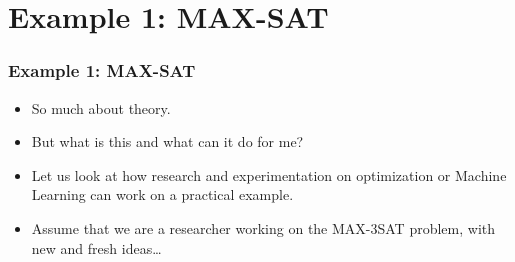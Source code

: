 %
\edef\maxSat{MAX-SAT}%
\edef\maxTSat{MAX-3SAT}%
\def\oFlip{\ensuremath{1}-flip}%
\def\tFlip{\ensuremath{2}-flip}%
\def\mFlip{\ensuremath{m}-flip}%
%
\section{Example 1: \maxSat}%
%
\xdef\maxSatExamplePath{../../examples/maxSat}%
%
%
\begin{frame}%
\frametitle{Example 1: \maxSat}%
\begin{itemize}%
\item So much about theory.%
\item<2-> But what is this \inQuotes{\optimizationBenchmarking} and what can it do for me?%
\item<3-> Let us look at how research and experimentation on optimization or Machine Learning can work on a practical example.\bigskip%
\item<4-> Assume that we are a researcher working on the {\maxTSat} problem, with new and fresh ideas\dots%
\end{itemize}%
\end{frame}%
\gdef\maxSatClauses{\textcolor{red}{\ensuremath{k}}}%
\gdef\maxSatVariables{\textcolor{green}{\ensuremath{n}}}%
\gdef\maxSatVariable{\ensuremath{x}}%
\gdef\maxSatVariablei#1{\ensuremath{\maxSatVariable_{#1}}}%
\gdef\maxSatFormula{\ensuremath{B}}%
\gdef\maxSatClause{\ensuremath{C}}%
\gdef\maxSatClausei#1{\ensuremath{\maxSatClause_{#1}}}%
